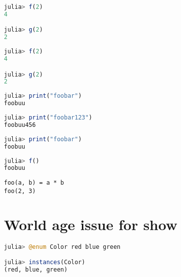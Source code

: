 \begin{lstlisting}[language=julia, style=jlcodestyle]
julia> f(2)
4

julia> g(2)
2
\end{lstlisting}




\begin{lstlisting}[language=julia, style=jlcodestyle]
julia> f(2)
4

julia> g(2)
2
\end{lstlisting}




\begin{lstlisting}[language=julia, style=jlcodestyle]
julia> print("foobar")
foobuu
\end{lstlisting}




\begin{lstlisting}[language=julia, style=jlcodestyle]
julia> print("foobar123")
foobuu456
\end{lstlisting}




\begin{lstlisting}[language=julia, style=jlcodestyle]
julia> print("foobar")
foobuu
\end{lstlisting}




\begin{lstlisting}[language=julia, style=jlcodestyle]
julia> f()
foobuu
\end{lstlisting}




\begin{lstlisting}[]
foo(a, b) = a * b
foo(2, 3)
\end{lstlisting}



\section{World age issue for show}



\label{11517531047354431104}{}



\begin{lstlisting}[language=julia, style=jlcodestyle]
julia> @enum Color red blue green

julia> instances(Color)
(red, blue, green)
\end{lstlisting}



